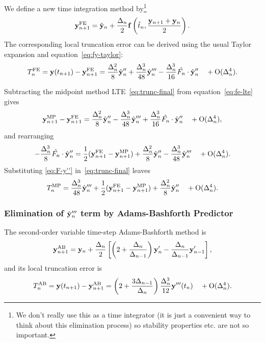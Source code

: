 We define a new time integration method by\footnote{We don't really use this as a time integrator (it is just a convenient way to think about this elimination process) so stability properties etc. are not so important.}
\begin{equation}
  \mathbf{y}_{n+1}^{\text{FE}} = \hat{\mathbf{y}}_{n} + \frac{\Delta_{n}}{2} {\mathbf{f}} \left(\hat{t}_{n}, \frac{\mathbf{y}_{n+1} + \mathbf{y}_n}{2}\right).
\end{equation}
The corresponding local truncation error can be derived using the usual Taylor expansion and equation~\eqref{eq:fy-taylor}:
\begin{equation}
  T_n^{\text{FE}} = \mathbf{y}(t_{n+1}) - \mathbf{y}_{n+1}^{\text{FE}}
  = \frac{\Delta_{n}^2}{8}\hat{\mathbf{y}}_{n}'' + \frac{\Delta_{n}^3}{48} \hat{\mathbf{y}}_{n}'''
  - \frac{\Delta_{n}^3}{16} \hat{F_{n}} \cdot \hat{\mathbf{y}}_{n}'' \quad + \text{O}(\Delta_{n}^4).
  \label{eq:fe-lte}
\end{equation}

Subtracting the midpoint method LTE~\eqref{eq:trunc-final} from equation~\eqref{eq:fe-lte} gives
\begin{equation}
  \mathbf{y}_{n+1}^{\text{MP}} - \mathbf{y}_{n+1}^{\text{FE}} = \frac{\Delta_{n}^2}{8}\hat{\mathbf{y}}_{n}'' - \frac{\Delta_{n}^3}{48} \hat{\mathbf{y}}_{n}'''
  + \frac{\Delta_{n}^3}{16} \hat{F_{n}} \cdot \hat{\mathbf{y}}_{n}'' \quad + \text{O}(\Delta_{n}^4),
\end{equation}
and rearranging
\begin{equation}
  - \frac{\Delta_{n}^3}{8} \hat{F_{n}} \cdot \hat{\mathbf{y}}_{n}''
  = \frac{1}{2} (\mathbf{y}_{n+1}^{\text{FE}} - \mathbf{y}_{n+1}^{\text{MP}}) + \frac{\Delta_{n}^2}{8}\hat{\mathbf{y}}_{n}''
  - \frac{\Delta_{n}^3}{48} \hat{\mathbf{y}}_{n}''' \quad + \text{O}(\Delta_{n}^4).
  \label{eq:F-y''}
\end{equation}
Substituting \eqref{eq:F-y''} in~\eqref{eq:trunc-final} leaves
\begin{equation}
  T_n^{\text{MP}} = \frac{\Delta_{n}^3}{48} \hat{\mathbf{y}}_{n}''' + \frac{1}{2} (\mathbf{y}_{n+1}^{\text{FE}} - \mathbf{y}_{n+1}^{\text{MP}})
  + \frac{\Delta_{n}^2}{8}\hat{\mathbf{y}}_{n}'' \quad + \text{O}(\Delta_{n}^4).
\end{equation}

\subsubsection{Elimination of $\hat{\mathbf{y}}_{n}'''$ term by Adams-Bashforth Predictor}
The second-order variable time-step Adams-Bashforth method is\cite[p.267]{Gresho-Sani}
\begin{equation}
  \mathbf{y}_{n+1}^{\text{AB}} = \mathbf{y}_n + \frac{\Delta_{n}}{2} \left[
    \left (2 + \frac{\Delta_{n}}{\Delta_{n-1}} \right) \mathbf{y}'_n
    - \frac{\Delta_{n}}{\Delta_{n-1}} \mathbf{y}'_{n-1}
    \right],
  \label{eq:AB2}
\end{equation}
and its local truncation error is\cite[p.267]{Gresho-Sani}
\begin{equation}
  T_n^{\text{AB}} = \mathbf{y}(t_{n+1}) - \mathbf{y}_{n+1}^{\text{AB}}
  = \left( 2 + \frac{3 \Delta_{n-1}}{\Delta_{n}} \right) \frac{\Delta_{n}^3}{12} \mathbf{y}'''(t_n)
  \quad + \text{O}(\Delta_{n}^4).
  \label{eq:AB2LTE}
\end{equation}


